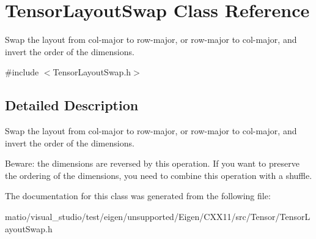 \hypertarget{class_tensor_layout_swap}{}\section{Tensor\+Layout\+Swap Class Reference}
\label{class_tensor_layout_swap}


Swap the layout from col-\/major to row-\/major, or row-\/major to col-\/major, and invert the order of the dimensions.  




{\ttfamily \#include $<$Tensor\+Layout\+Swap.\+h$>$}



\subsection{Detailed Description}
Swap the layout from col-\/major to row-\/major, or row-\/major to col-\/major, and invert the order of the dimensions. 

Beware\+: the dimensions are reversed by this operation. If you want to preserve the ordering of the dimensions, you need to combine this operation with a shuffle. 

The documentation for this class was generated from the following file\+:\begin{DoxyCompactItemize}
\item 
matio/visual\+\_\+studio/test/eigen/unsupported/\+Eigen/\+C\+X\+X11/src/\+Tensor/\+Tensor\+Layout\+Swap.\+h\end{DoxyCompactItemize}
